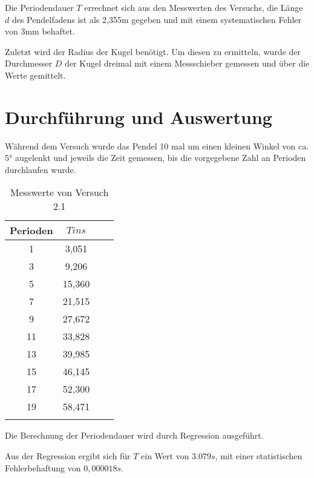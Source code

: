 Die Periodendauer $T$ errechnet sich aus den Messwerten des Versuchs, die Länge $d$ des Pendelfadens ist als 2,355m gegeben und mit einem systematischen Fehler von 3mm behaftet.

Zuletzt wird der Radius der Kugel benötigt. Um diesen zu ermitteln, wurde der Durchmesser $D$ der Kugel dreimal mit einem Messschieber gemessen und über die Werte gemittelt.

\section{Durchführung und Auswertung}

Während dem Versuch wurde das Pendel 10 mal um einen kleinen Winkel von ca. 5° augelenkt und jeweils die Zeit gemessen, bis die vorgegebene Zahl an Perioden durchlaufen wurde.

\begin{table}[h!]
    \begin{center}
        \caption{Messwerte von Versuch 2.1}
        \begin{tabular}{cccc}
            \hline
            Perioden  & $T in s$  \\
            \hline
            1                   & 3,051		\\
            3                   & 9,206		\\
            5                   & 15,360	\\
            7                   & 21,515	\\
            9                   & 27,672	\\
            11                  & 33,828	\\
            13                  & 39,985	\\
            15                  & 46,145	\\
	        17                  & 52,300	\\
	        19                  & 58,471	\\
            \hline
            \label{tab:2_1-werte}
        \end{tabular}
    \end{center}
\end{table}


Die Berechnung der Periodendauer wird durch Regression ausgeführt.

Aus der Regression ergibt sich für $T$ ein Wert von $3.079s$, mit einer statistischen Fehlerbehaftung von $0,000018s$.

